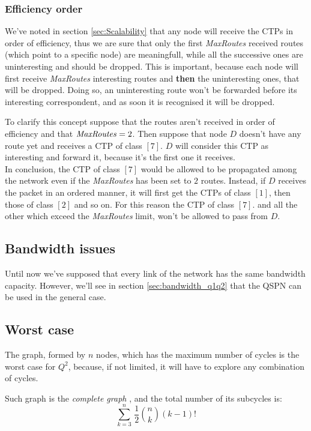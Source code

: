 \documentclass[a4paper]{article}
\begin{document}
\subsubsection{Efficiency order}
\label{sec:eff_order}

We've noted in section \ref{sec:Scalability} that any node will receive the
CTPs in order of efficiency, thus we are sure that only the first
\emph{MaxRoutes} received routes (which point to a specific node) are
meaningfull, while all the successive ones are uninteresting and should be
dropped. This is important, because each
node will first receive \emph{MaxRoutes} interesting routes and
\textbf{then} the uninteresting ones, that will be dropped. 
Doing so, an uninteresting route won't be forwarded before its interesting
correspondent, and as soon it is recognised it will be dropped.

To clarify this concept suppose that the routes aren't received in order of
efficiency and that $\textrm{\emph{MaxRoutes}}=2$. Then suppose that node $D$ doesn't
have any route yet and receives a CTP of class $[7]$. $D$ will consider this
CTP as interesting and forward it, because it's the first one it receives.\\
In conclusion, the CTP of class $[7]$ would be allowed to be propagated among
the network even if the \emph{MaxRoutes} has been set to $2$ routes.
Instead, if $D$ receives the packet in an ordered
manner, it will first get the CTPs of class $[1]$, then those of class $[2]$
and so on. For this reason the CTP of class $[7]$. and all the other which
exceed the \emph{MaxRoutes} limit, won't be allowed to pass from $D$.

\subsection{Bandwidth issues}
Until now we've supposed that every link of the network has the same bandwidth
capacity. However, we'll see in section \ref{sec:bandwidth_q1q2} that the QSPN
can be used in the general case.

\subsection{Worst case}
\label{worstcase}
The graph, formed by $n$ nodes, which has the maximum number of cycles is the
worst case for $Q^2$, because, if not limited, it will have to explore any
combination of cycles.

Such graph is the \emph{complete graph} \cite{completegraph}, and the total
number of its subcycles is:
\[
\sum_{k=3}^n\,\frac{1}{2}\binom{n}{k}(k-1)!
\]
\end{document}
